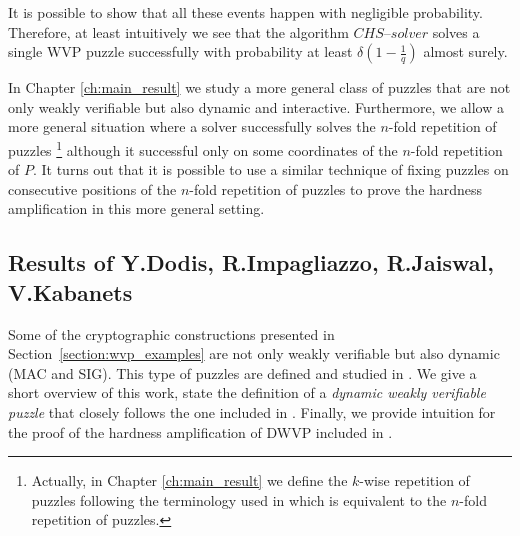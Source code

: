 It is possible to show that all these events happen with negligible probability.
Therefore, at least intuitively we see that the algorithm $\mathit{CHS\text{--}solver}$
solves a single WVP puzzle successfully with probability at least $\delta(1\!-\!\frac{1}{q})$ almost surely.

In Chapter \ref{ch:main_result} we study a more general class of puzzles that are not only weakly verifiable but also dynamic and interactive.
Furthermore, we allow a more general situation where a solver successfully solves the $n$-fold repetition of puzzles \footnote{Actually,
in Chapter \ref{ch:main_result} we define the $k$-wise repetition of puzzles following the terminology used in \cite{Dodis:2009:SAI:1530441.1530450}
which is equivalent to the $n$-fold repetition of puzzles.}
although it successful only on some coordinates of the $n$-fold repetition of $P$.
It turns out that it is possible to use a similar technique of fixing puzzles on consecutive positions of the $n$-fold repetition of
puzzles to prove the hardness amplification in this more general setting.
%
\subsection{Results of Y.Dodis, R.Impagliazzo, R.Jaiswal, V.Kabanets}
\label{subsec:dijk}
Some of the cryptographic constructions presented in Section~\ref{section:wvp_examples}
are not only weakly verifiable but also dynamic (MAC and SIG). This type of puzzles are defined and studied in \cite{Dodis:2009:SAI:1530441.1530450}.
We give a short overview of this work, state the definition of a \textit{dynamic weakly verifiable puzzle} that closely follows
the one included in \cite{Dodis:2009:SAI:1530441.1530450}. Finally, we provide intuition for the proof of the hardness amplification of DWVP
included in \cite{Dodis:2009:SAI:1530441.1530450}.

